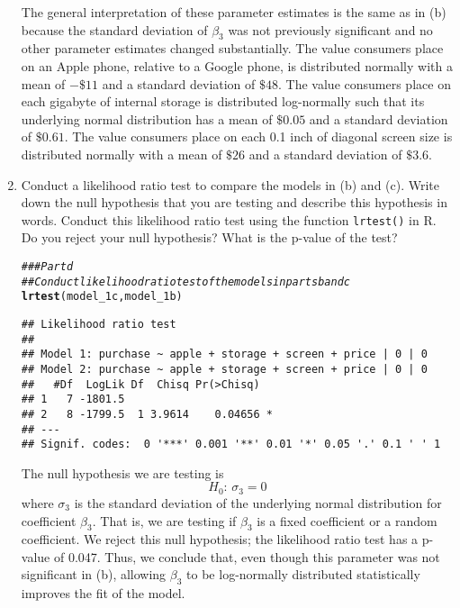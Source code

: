 \documentclass[11pt,letterpaper]{article}\usepackage[]{graphicx}\usepackage[]{color}
\makeatletter
\newcommand{\hlcom}[1]{\textcolor[rgb]{0.678,0.584,0.686}{\textit{#1}}}%
\newcommand{\hlstd}[1]{\textcolor[rgb]{0.345,0.345,0.345}{#1}}%
\newcommand{\hlkwd}[1]{\textcolor[rgb]{0.737,0.353,0.396}{\textbf{#1}}}%
\newenvironment{kframe}{%
 \def\at@end@of@kframe{}%
 \ifinner\ifhmode%
  \def\at@end@of@kframe{\end{minipage}}%
  \begin{minipage}{\columnwidth}%
 \fi\fi%
 \def\FrameCommand##1{\hskip\@totalleftmargin \hskip-\fboxsep
 \colorbox{shadecolor}{##1}\hskip-\fboxsep
     \hskip-\linewidth \hskip-\@totalleftmargin \hskip\columnwidth}%
 \MakeFramed {\advance\hsize-\width
   \@totalleftmargin\z@ \linewidth\hsize
   \@setminipage}}%
 {\par\unskip\endMakeFramed%
 \at@end@of@kframe}
\newenvironment{knitrout}{}{} %
\makeatother
\begin{document}
\begin{enumerate}[label=\alph*., leftmargin=*]
	The general interpretation of these parameter estimates is the same as in (b) because the standard deviation of $\beta_3$ was not previously significant and no other parameter estimates changed substantially. The value consumers place on an Apple phone, relative to a Google phone, is distributed normally with a mean of $-\$11$ and a standard deviation of $\$48$. The value consumers place on each gigabyte of internal storage is distributed log-normally such that its underlying normal distribution has a mean of $\$0.05$ and a standard deviation of $\$0.61$. The value consumers place on each 0.1 inch of diagonal screen size is distributed normally with a mean of $\$26$ and a standard deviation of $\$3.6$.

	\item Conduct a likelihood ratio test to compare the models in (b) and (c). Write down the null hypothesis that you are testing and describe this hypothesis in words. Conduct this likelihood ratio test using the function \texttt{lrtest()} in R. Do you reject your null hypothesis? What is the p-value of the test?

\begin{knitrout}
\color{fgcolor}\begin{kframe}
\begin{alltt}
\hlcom{### Part d}
\hlcom{## Conduct likelihood ratio test of the models in parts b and c}
\hlkwd{lrtest}\hlstd{(model_1c, model_1b)}
\end{alltt}
\begin{verbatim}
## Likelihood ratio test
## 
## Model 1: purchase ~ apple + storage + screen + price | 0 | 0
## Model 2: purchase ~ apple + storage + screen + price | 0 | 0
##   #Df  LogLik Df  Chisq Pr(>Chisq)  
## 1   7 -1801.5                       
## 2   8 -1799.5  1 3.9614    0.04656 *
## ---
## Signif. codes:  0 '***' 0.001 '**' 0.01 '*' 0.05 '.' 0.1 ' ' 1
\end{verbatim}
\end{kframe}
\end{knitrout}

	The null hypothesis we are testing is
	$$H_0 \text{: } \sigma_3 = 0$$
	where $\sigma_3$ is the standard deviation of the underlying normal distribution for coefficient $\beta_3$. That is, we are testing if $\beta_3$ is a fixed coefficient or a random coefficient. We reject this null hypothesis; the likelihood ratio test has a p-value of 0.047. Thus, we conclude that, even though this parameter was not significant in (b), allowing $\beta_3$ to be log-normally distributed statistically improves the fit of the model.


\end{enumerate}
\end{document}
